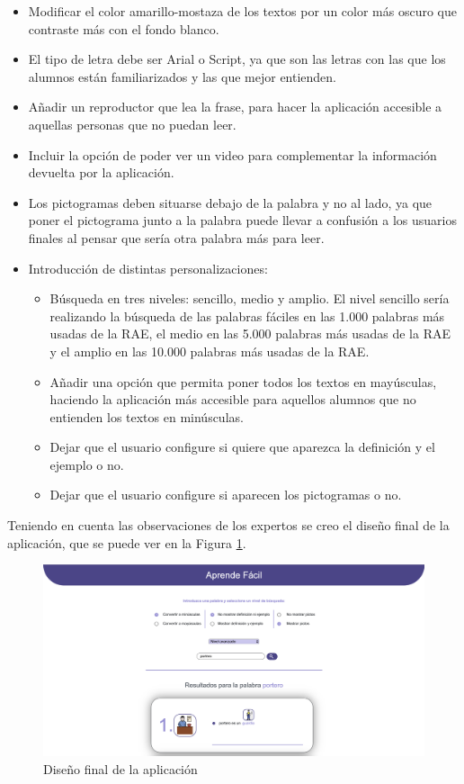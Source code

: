 \begin{itemize} 
	\item Modificar el color amarillo-mostaza de los textos por un color más oscuro que contraste más con el fondo blanco.
	\item El tipo de letra debe ser Arial o Script, ya que son las letras con las que los alumnos están familiarizados y las que mejor entienden.
	\item Añadir un reproductor que lea la frase, para hacer la aplicación accesible a aquellas personas que no puedan leer.
	\item Incluir la opción de poder ver un video para complementar la información devuelta por la aplicación.
	\item Los pictogramas deben situarse debajo de la palabra y no al lado, ya que poner el pictograma junto a la palabra puede llevar a confusión a los usuarios finales al pensar que sería otra palabra más para leer. 
	\item Introducción de distintas personalizaciones:
	\begin{itemize}
		\item Búsqueda en tres niveles: sencillo, medio y amplio. El nivel sencillo sería realizando la búsqueda de las palabras fáciles en las 1.000 palabras más usadas de la RAE, el medio en las 5.000 palabras más usadas de la RAE y el amplio en las 10.000 palabras más usadas de la RAE. 
		\item Añadir una opción que permita poner todos los textos en mayúsculas, haciendo la aplicación más accesible para aquellos alumnos que no entienden los textos en minúsculas.
		\item Dejar que el usuario configure si quiere que aparezca la definición y el ejemplo o no.
		\item Dejar que el usuario configure  si aparecen los pictogramas o no.
	\end{itemize}
\end{itemize}

Teniendo en cuenta las observaciones de los expertos se creo el diseño final de la aplicación, que se puede ver en la Figura \ref{fig:disenioFinal}.

\begin{figure}[!h]
	\includegraphics[width=.9\textwidth]{Imagenes/Bitmap/Capitulo4/aplicacionFinal.png}
	\centering
	\caption{Diseño final de la aplicación}
	\label{fig:disenioFinal}
\end{figure}




